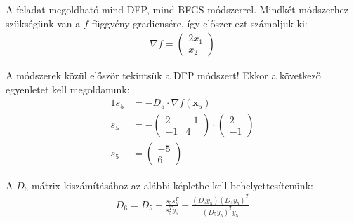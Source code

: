 \begin{megoldas}
A feladat megoldható mind DFP, mind BFGS módszerrel. Mindkét módszerhez szükségünk van a $f$ függvény gradiensére, így előszer ezt számoljuk ki:
\begin{gather*}
\nabla f=\left(\begin{array}{c}2x_1\\x_2\end{array}\right)
\end{gather*}

A módszerek közül először tekintsük a DFP módszert! Ekkor a következő egyenletet kell megoldanunk:
\begin{alignat*}{1}
s_5&=-D_5\cdot\nabla f(\mathbf{x}_5)\\
s_5&=-\left(\begin{array}{cc}2&-1\\-1&4\end{array}\right)\cdot\left(\begin{array}{c}2\\-1\end{array}\right)\\
s_5&=\left(\begin{array}{c}-5\\6\end{array}\right)
\end{alignat*}

A $D_6$ mátrix kiszámításához az alábbi képletbe kell behelyettesítenünk:
\begin{gather*}
D_6=D_5+\frac{s_5s_5^T}{s_5^Ty_5}-\frac{(D_5y_5)(D_5y_5)^T}{(D_5y_5)^Ty_5}
\end{gather*}


\end{megoldas}
